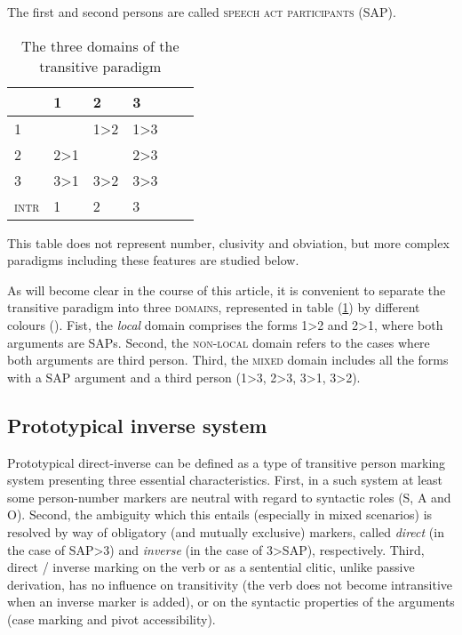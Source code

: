 \documentclass[twoside,a4paper,11pt]{article}
\newcommand{\grise}[1]{\cellcolor{lightgray}\textbf{#1}}
\begin{document}
The first and second persons are called \textsc{speech act participants} (SAP).  


\begin{table}[H] 
\caption{The three domains of the transitive paradigm} 
 \centering \label{tab:domain}
\begin{tabular}{l|lllll} 
\toprule
&1 & 2 &3\\
\hline
1 &\grise{} &1>2\cellcolor[wave]{465} & 1>3 \cellcolor[wave]{520} \\
2&2>1\cellcolor[wave]{465}&\grise{}&2>3 \cellcolor[wave]{520} \\
3&3>1 \cellcolor[wave]{520}&3>2 \cellcolor[wave]{520}&3>3\cellcolor[wave]{650}\\
\hline
\textsc{intr}&1&2&3\\
\bottomrule
\end{tabular}
\end{table}
 This table does not represent number, clusivity and obviation, but more complex paradigms including these features are studied below.
 
As will become clear in the course of this article, it is convenient to separate the transitive paradigm into three \textsc{domains}, represented in table  (\ref{tab:domain}) by different colours (\citealt[revérifier]{zuniga06}). Fist, the \textit{local} domain comprises the forms 1>2 and 2>1, where both arguments are SAPs. Second, the \textsc{non-local} domain refers to the cases where both arguments are third person. Third, the \textsc{mixed} domain includes all the forms with a SAP argument and a third person (1>3, 2>3, 3>1, 3>2). 

\subsection{Prototypical inverse system} \label{sec:prototyp}

Prototypical direct-inverse can be defined  as a type of transitive person marking system  presenting three essential characteristics. First, in a such system at least some person-number markers are neutral with regard to syntactic roles (S, A and O). Second, the ambiguity which this entails (especially in mixed scenarios) is resolved by way of obligatory (and mutually exclusive) markers, called \textit{direct} (in the case of SAP>3) and \textit{inverse} (in the case of 3>SAP), respectively. Third, direct / inverse marking on the verb or as a sentential clitic, unlike passive derivation, has no influence on transitivity (the verb does not become intransitive when an inverse marker is added), or on the syntactic properties of the arguments (case marking and pivot accessibility).
\end{document}
